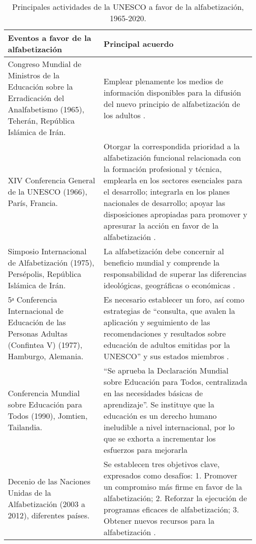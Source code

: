 \documentclass{textolivre}
\begin{document}
\newpage
\begin{small}
\begin{longtable}{
    >{\raggedright\arraybackslash}
    p{}
    p{}
    }
\caption{Principales actividades de la UNESCO a favor de la alfabetización, 1965-2020.}
\label{tbl01}
\\
\toprule
Eventos a favor de la alfabetización & Principal acuerdo \\ 
\midrule
\arrayrulecolor[gray]{.7}
Congreso Mundial de Ministros de la Educación sobre la Erradicación del Analfabetismo (1965), Teherán, República Islámica de Irán. &
Emplear plenamente los medios de información disponibles para la difusión del nuevo principio de alfabetización de los adultos \cite{fernandez_1966}. \\
\midrule
XIV Conferencia General de la UNESCO (1966), París, Francia. &
Otorgar la correspondida prioridad a la  alfabetización funcional relacionada con la formación profesional y técnica, emplearla en los sectores esenciales para el desarrollo; integrarla en los planes nacionales de desarrollo; apoyar las disposiciones apropiadas para promover y apresurar la acción en favor de la  alfabetización \cite{unesco_actas_1969}. \\
\midrule
Simposio Internacional de  Alfabetización (1975), Persépolis, República Islámica de Irán. &
La alfabetización debe concernir al beneficio mundial y comprende la responsabilidad de superar las diferencias ideológicas, geográficas o económicas \cite{unesco_consejo_1987}. \\
\midrule
5ᵃ Conferencia Internacional de Educación de las Personas Adultas (Confintea V) (1977), Hamburgo, Alemania. &
Es necesario establecer un foro, así como estrategias de “consulta, que avalen la  aplicación y seguimiento de las recomendaciones y resultados sobre educación de adultos emitidas por la UNESCO” y sus estados miembros \cite[p. 44]{unesco_quinta_1997}. \\
\midrule
Conferencia Mundial sobre Educación para Todos (1990), Jomtien, Tailandia. &
“Se aprueba la Declaración Mundial sobre Educación para Todos, centralizada en las necesidades básicas de aprendizaje”. Se instituye que la educación es un derecho  humano ineludible a nivel internacional, por lo que se exhorta a incrementar los esfuerzos para mejorarla \cite[p. 97]{haggis_conferencia_1992} \\
\midrule
Decenio de las Naciones Unidas de la Alfabetización (2003 a 2012), diferentes países. &
Se establecen tres objetivos clave, expresados como desafíos: 1. Promover un compromiso más firme en favor de la alfabetización; 2. Reforzar la ejecución de programas eficaces de alfabetización; 3. Obtener nuevos recursos para la alfabetización \cite{unesco_decenio_2009}. \\

\end{longtable}
\end{small}
\end{document}
